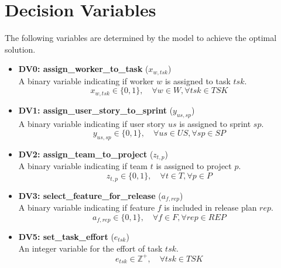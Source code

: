\documentclass{article}
\begin{document}
\section{Decision Variables}
The following variables are determined by the model to achieve the optimal solution.
\begin{itemize}
    \item \textbf{DV0: assign\_worker\_to\_task} ($x_{w,tsk}$)\\ A binary variable indicating if worker $w$ is assigned to task $tsk$.
        $$ x_{w,tsk} \in \{0, 1\}, \quad \forall w \in W, \forall tsk \in TSK $$
    \item \textbf{DV1: assign\_user\_story\_to\_sprint} ($y_{us,sp}$)\\ A binary variable indicating if user story $us$ is assigned to sprint $sp$.
        $$ y_{us,sp} \in \{0, 1\}, \quad \forall us \in US, \forall sp \in SP $$
    \item \textbf{DV2: assign\_team\_to\_project} ($z_{t,p}$)\\ A binary variable indicating if team $t$ is assigned to project $p$.
        $$ z_{t,p} \in \{0, 1\}, \quad \forall t \in T, \forall p \in P $$
    \item \textbf{DV3: select\_feature\_for\_release} ($a_{f,rep}$)\\ A binary variable indicating if feature $f$ is included in release plan $rep$.
        $$ a_{f,rep} \in \{0, 1\}, \quad \forall f \in F, \forall rep \in REP $$
    \item \textbf{DV5: set\_task\_effort} ($e_{tsk}$)\\ An integer variable for the effort of task $tsk$.
        $$ e_{tsk} \in \mathbb{Z}^+, \quad \forall tsk \in TSK $$
\end{itemize}
\end{document}
